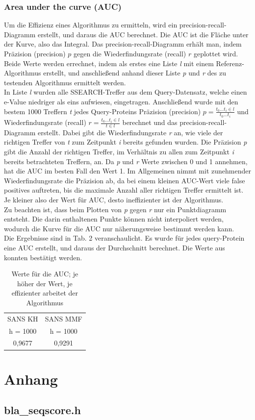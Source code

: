 \documentclass{article}
\begin{document}
\subsubsection{Area under the curve (AUC)}


Um die Effizienz eines Algorithmus zu ermitteln, wird ein precision-recall-Diagramm erstellt, und daraus die AUC berechnet. Die AUC ist die Fläche unter der Kurve, also das Integral. Das precision-recall-Diagramm erhält man, indem Präzision (precision) $p$ gegen die Wiederfindungsrate (recall) $r$ geplottet wird. Beide Werte werden errechnet, indem als erstes eine Liste \textit l mit einem Referenz-Algorithmus erstellt, und anschließend anhand dieser Liste \textit p und \textit r des zu testenden Algorithmus ermittelt werden.\\In Liste \textit l wurden alle SSEARCH-Treffer aus dem Query-Datensatz, welche einen e-Value niedriger als eins aufwiesen, eingetragen. Anschließend wurde mit den bestem 1000 Treffern \textit t jedes Query-Proteins Präzision (precision) $p = \frac{t_0 ... t_i \in l}{t_0 ... t_i}$ und Wiederfindungsrate (recall) $r = \frac {t_0 ... t_i \in l}{t \in l}$ berechnet und das precision-recall-Diagramm erstellt. Dabei gibt die Wiederfindungsrate \textit r an, wie viele der richtigen Treffer von \textit t zum Zeitpunkt \textit i bereits gefunden wurden. Die Präzision \textit p gibt die Anzahl der richtigen Treffer, im Verhältnis zu allen zum Zeitpunkt \textit i bereits betrachteten Treffern, an. Da \textit p und \textit r Werte zwischen 0 und 1 annehmen, hat die AUC im besten Fall den Wert 1. Im Allgemeinen nimmt mit zunehmender Wiederfindungsrate die Präzision ab, da bei einem kleinen AUC-Wert viele false positives auftreten, bis die maximale Anzahl aller richtigen Treffer ermittelt ist. Je kleiner also der Wert für AUC, desto ineffizienter ist der Algorithmus.\\Zu beachten ist, dass beim Plotten von \textit p gegen \textit r nur ein Punktdiagramm entsteht. Die darin enthaltenen Punkte können nicht interpoliert werden, wodurch die Kurve für die AUC nur näherungsweise bestimmt werden kann.\\Die Ergebnisse sind in Tab. 2 veranschaulicht. Es wurde für jedes query-Protein eine AUC erstellt, und daraus der Durchschnitt berechnet. Die Werte aus \cite{Holm} konnten bestätigt werden.

  \begin{table}[h]
    \centering
    \caption{Werte für die AUC; je höher der Wert, je effizienter arbeitet der Algorithmus}
    \begin{tabular}{cc}
      \hline
      SANS KH & SANS MMF\\
      h = 1000 & h = 1000 \\
      \hline
      0,9677 & 0,9291 \\
      \hline
    \end{tabular}
  \end{table}


{}

\pagebreak
\section{Anhang}
\subsection*{bla\_seqscore.h}

\end{document}
